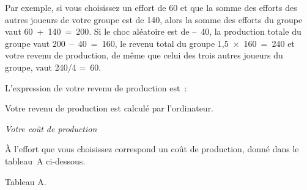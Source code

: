 \begin{Article}
\begin{refsection}[Lebourges]
\begin{appendices}
Par exemple, si vous choisissez un effort de 60 et que la somme des
efforts des autres joueurs de votre groupe est de 140, alors la somme
des efforts du groupe vaut 60~+~140~=~200. Si le choc aléatoire est de
--~40, la production totale du groupe vaut 200~--~40~=~160, le revenu
total du groupe 1,5~×~160~=~240 et votre revenu de production, de même
que celui des trois autres joueurs du groupe, vaut 240/4 =~60.

L'expression de votre revenu de production est~:
\begin{center}
\noindent{}
\end{center}

Votre revenu de production est calculé par l'ordinateur.
\vspace{0,2cm}

\emph{Votre coût de production}

\vspace{0,2cm}
À l'effort que vous choisissez correspond un coût de production, donné
dans le tableau~A ci-dessous.

\newpage

{\centering Tableau A.\par}


\end{appendices}
\end{refsection}
\end{Article}
